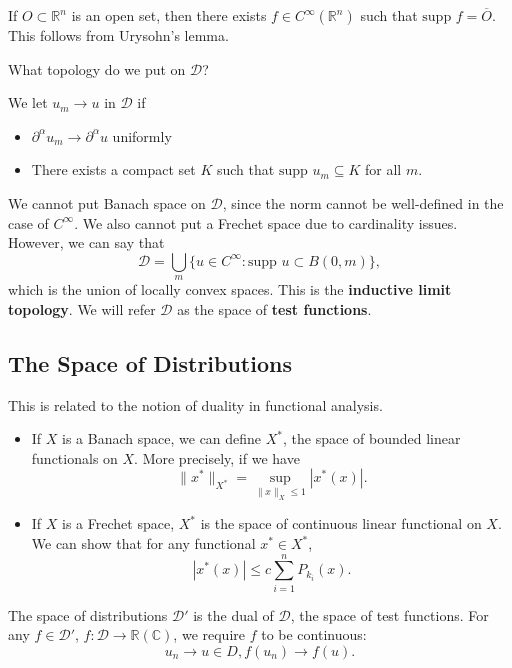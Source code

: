 \documentclass[11pt]{scrartcl}
\newcommand{\R}{\mathbb{R}}
\newcommand{\C}{\mathbb C}
\newcommand{\supp}{\text{supp }}
\begin{document}
\begin{fact} If $O \subset \R^n$ is an open set, then there exists $f \in C^{\infty}(\R^n)$ such that $\supp f = \overline{O}$. This follows from Urysohn's lemma.
\end{fact}

What topology do we put on $\mathcal{D}$?  

\begin{definition} We let $u_m \rightarrow u$ in $\mathcal D$ if 
\begin{itemize}
\item $\partial^\alpha u_m \rightarrow \partial^\alpha u$ uniformly
\item There exists a compact set $K$ such that $\supp u_m\subseteq K$ for all $m$.
\end{itemize}
\end{definition}

We cannot put Banach space on $\mathcal D$, since the norm cannot be well-defined in the case of $C^{\infty}$.  We also cannot put a Frechet space due to cardinality issues.  However, we can say that
$$\mathcal D = \bigcup_m \{u \in C^{\infty}: \supp u \subset B(0, m)\},$$
which is the union of locally convex spaces.  This is the \textbf{inductive limit topology}.  We will refer $\mathcal D$ as the space of \textbf{test functions}.

\subsection{The Space of Distributions}
This is related to the notion of duality in functional analysis. 

\begin{itemize}
 \item If $X$ is a Banach space, we can define $X^*$, the space of bounded linear functionals on $X$.  More precisely, if we have $$\|x^*\|_{X^*} = \sup_{\|x\|_X \le 1} |x^*(x)|.$$
 \item If $X$ is a Frechet space, $X^*$ is the space of continuous linear functional on $X$.  We can show that for any functional $x^* \in X^*$,
 $$|x^*(x)| \le c \sum_{i=1}^n P_{k_i}(x).$$
 \end{itemize} 
\begin{definition} The space of distributions $\mathcal D'$ is the dual of $\mathcal D$, the space of test functions.  For any $f \in \mathcal D'$, $f : \mathcal D \rightarrow \R(\C)$, we require $f$ to be continuous:
$$u_n \rightarrow u \in D, f(u_n) \rightarrow f(u).$$
\end{definition}
\end{document}
